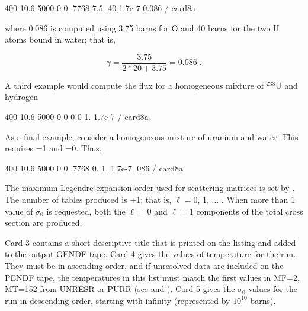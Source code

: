 \small
\begin{ccode}

   400 10.6 5000 0 0 .7768 7.5 .40 1.7e-7 0.086 / card8a

\end{ccode}
\normalsize

\noindent
where 0.086 is computed using 3.75 barns for O and 40 barns for the
two H atoms bound in water; that is,

\begin{equation}
  \gamma = \frac{3.75}{2*20 + 3.75}  = 0.086\;.
\end{equation}
\vspace{0.5 pt}

\noindent
A third example would compute the flux for a homogeneous mixture of
$^{238}$U and hydrogen

\small
\begin{ccode}

   400 10.6 5000 0 0 0 0 1. 1.7e-7 / card8a

\end{ccode}
\normalsize

\noindent
As a final example, consider a homogeneous mixture of uranium and water.
This requires =1 and =0.  Thus,

\small
\begin{ccode}

   400 10.6 5000 0 0 .7768 0. 1. 1.7e-7 .086 / card8a

\end{ccode}
\normalsize

The maximum Legendre expansion order used for scattering matrices is set
by .  The number of tables produced is +1; that is,
$\ell=0$, 1, ... .  When more than 1 value of $\sigma_0$
is requested, both the $\ell{=}0$ and $\ell{=}1$ components of the
total cross section are produced.

Card 3 contains a short descriptive title that is printed on the listing
and added to the output GENDF tape.  Card 4 gives the  values
of temperature for the run.  They must be in ascending order, and if
unresolved data are included on the PENDF tape, the temperatures in this
list must match the first  values in MF=2, MT=152 from
\hyperlink{sUNRESRhy}{UNRESR} or
\hyperlink{sPURRhy}{PURR} (see
 and
).  Card 5 gives the
$\sigma_0$ values for the run in descending order, starting with
infinity (represented by $10^{10}$ barns).

